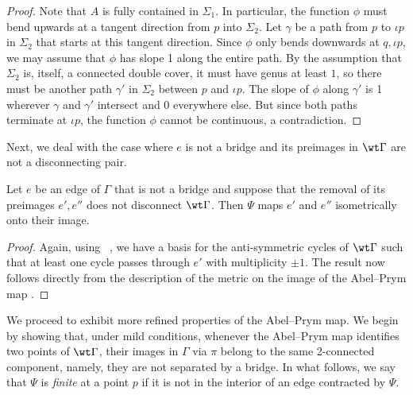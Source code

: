 \begin{proof}
Note that $A$ is fully contained in $\Sigma_1$.  
In particular, the function $\phi$ must bend upwards at a tangent direction from $p$ into $\Sigma_2$. Let $\gamma$ be a path from $p$ to $\iota p$ in $\Sigma_2$ that starts at this tangent direction. Since $\phi$ only bends downwards at $q, \iota p$, we may assume that $\phi$ has slope 1 along the entire path. 
By the assumption that $\Sigma_2$ is, itself, a connected double cover, it must have genus at least $1$, 
so there must be another path  $\gamma'$ in $\Sigma_2$ between $p$ and $\iota p$.
The  slope of $\phi$ along $\gamma'$ is 1 wherever $\gamma$ and $\gamma'$ intersect and 0 everywhere else. But since both paths terminate at $\iota p$, the function $\phi$ cannot be continuous, a contradiction. 
\end{proof}

Next, we deal with the case where $e$ is not a bridge and its preimages in $\wt\Gamma$ are not a disconnecting pair. 

\begin{lemma}\label{lem:notBridgeNotDisconnectingPair}
      Let $e$ be an edge of $\Gamma$ that is not a bridge  and suppose that the removal of its preimages  $e',e''$ does not disconnect $\wt\Gamma$.  
    Then $\Psi$ maps $e'$ and $e''$ isometrically onto their image. 
\end{lemma}
 
\begin{proof}
Again, using   ~\cite[Construction B]{LZ22}, we have a basis for the anti-symmetric cycles of $\wt\Gamma$ such that at least one cycle passes through $e'$ with multiplicity $\pm 1$. The result now follows directly from the description of the metric on the image of the Abel--Prym map .
\end{proof}

We proceed to exhibit more refined properties of the Abel--Prym map. We begin by showing that,  under mild conditions, whenever the Abel--Prym map identifies two points of $\wt\Gamma$, their images in $\Gamma$ via $\pi$ belong to the same  2-connected component, namely, they are not separated by a bridge. In what follows, we say that $\Psi$ is \emph{finite} at a point $p$ if it is not in the interior of an edge contracted by $\Psi$.  

